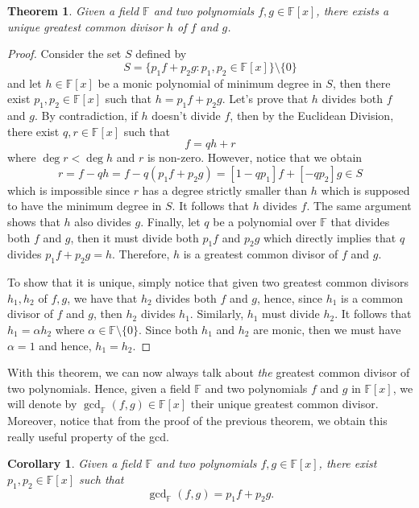 \documentclass{article}
\theoremstyle{plain}
\newtheorem{theorem}{Theorem}[subsection]
\newtheorem*{corollary}{Corollary}
\theoremstyle{definition}
\newcommand{\F}{\mathbb{F}}
\begin{document}
\begin{theorem}
    Given a field $\F$ and two polynomials $f, g \in \F[x]$, there exists a unique greatest common divisor $h$ of $f$ and $g$.
\end{theorem}

\begin{proof}
    Consider the set $S$ defined by
    $$S = \{p_1f + p_2g : p_1, p_2 \in \F[x]\}\setminus \{0\}$$
    and let $h \in \F[x]$ be a monic polynomial of minimum degree in $S$, then there exist $p_1, p_2 \in \F[x]$ such that $h = p_1f + p_2g$. Let's prove that $h$ divides both $f$ and $g$. By contradiction, if $h$ doesn't divide $f$, then by the Euclidean Division, there exist $q,r \in \F[x]$ such that
    $$f = qh + r$$
    where $\deg r < \deg h$ and $r$ is non-zero. However, notice that we obtain
    $$r = f - qh = f - q(p_1f + p_2g) = [1 - qp_1]f + [-qp_2]g \in S$$
    which is impossible since $r$ has a degree strictly smaller than $h$ which is supposed to have the minimum degree in $S$. It follows that $h$ divides $f$. The same argument shows that $h$ also divides $g$. Finally, let $q$ be a polynomial over $\F$ that divides both $f$ and $g$, then it must divide both $p_1 f$ and $p_2 g$ which directly implies that $q$ divides $p_1 f + p_2 g = h$. Therefore, $h$ is a greatest common divisor of $f$ and $g$.
    
    To show that it is unique, simply notice that given two greatest common divisors $h_1, h_2$ of $f, g$, we have that $h_2$ divides both $f$ and $g$, hence, since $h_1$ is a common divisor of $f$ and $g$, then $h_2$ divides $h_1$. Similarly, $h_1$ must divide $h_2$. It follows that $h_1 = \alpha h_2$ where $\alpha \in \F \setminus \{0\}$. Since both $h_1$ and $h_2$ are monic, then we must have $\alpha = 1$ and hence, $h_1 = h_2$. 
\end{proof}

With this theorem, we can now always talk about \textit{the} greatest common divisor of two polynomials. Hence, given a field $\F$ and two polynomials $f$ and $g$ in $\F[x]$, we will denote by $\gcd_{\F}(f,g) \in \F[x]$ their unique greatest common divisor. Moreover, notice that from the proof of the previous theorem, we obtain this really useful property of the gcd.

\begin{corollary}
\label{bezout}
    Given a field $\F$ and two polynomials $f,g \in \F[x]$, there exist $p_1, p_2 \in \F[x]$ such that
    $$\gcd\nolimits_{\F}(f,g) = p_1 f + p_2 g.$$ 
\end{corollary}
\end{document}
